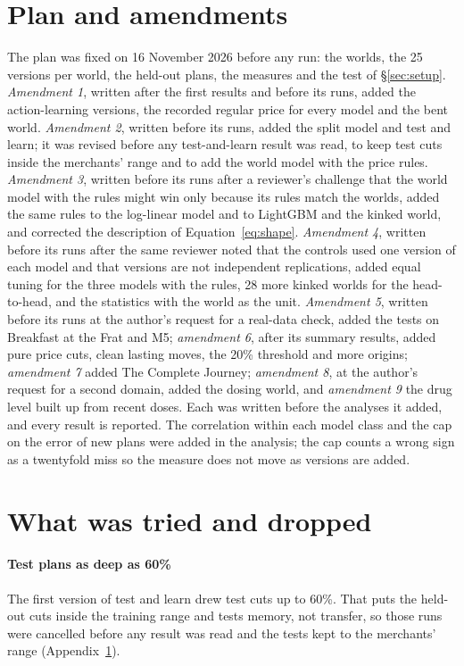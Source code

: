 \section{Plan and amendments}\label{app:plan}

The plan was fixed on 16 November 2026 before any run: the worlds, the 25 versions per world, the held-out plans,
the measures and the test of \S\ref{sec:setup}. \emph{Amendment 1}, written after the first results and before its
runs, added the action-learning versions, the recorded regular price for every model and the bent world.
\emph{Amendment 2}, written before its runs, added the split model and test and learn; it was revised before any
test-and-learn result was read, to keep test cuts inside the merchants' range and to add the world model with the
price rules. \emph{Amendment 3}, written before its runs after a reviewer's challenge that the world model with the
rules might win only because its rules match the worlds, added the same rules to the log-linear model and to
LightGBM and the kinked world, and corrected the description of Equation~\eqref{eq:shape}. \emph{Amendment 4}, written before its runs after
the same reviewer noted that the controls used one version of each model and that versions are not independent
replications, added equal tuning for the three models with the rules, 28 more kinked worlds for the head-to-head,
and the statistics with the world as the unit. \emph{Amendment 5}, written before its runs at the author's request
for a real-data check, added the tests on Breakfast at the Frat and M5; \emph{amendment 6}, after its summary
results, added pure price cuts, clean lasting moves, the 20\% threshold and more origins; \emph{amendment 7} added The
Complete Journey; \emph{amendment 8}, at the author's request for a second domain, added the dosing world, and \emph{amendment 9}
the drug level built up from recent doses.
Each was written before the analyses it added, and every result is reported. The correlation within each model class and the cap on the error of new plans were added in the
analysis; the cap counts a wrong sign as a twentyfold miss so the measure does not move as versions are added.

\section{What was tried and dropped}\label{sec:dropped}

\paragraph{Test plans as deep as 60\%} The first version of test and learn drew test cuts up to 60\%. That puts the
held-out cuts inside the training range and tests memory, not transfer, so those runs were cancelled before any
result was read and the tests kept to the merchants' range (Appendix~\ref{app:plan}).

